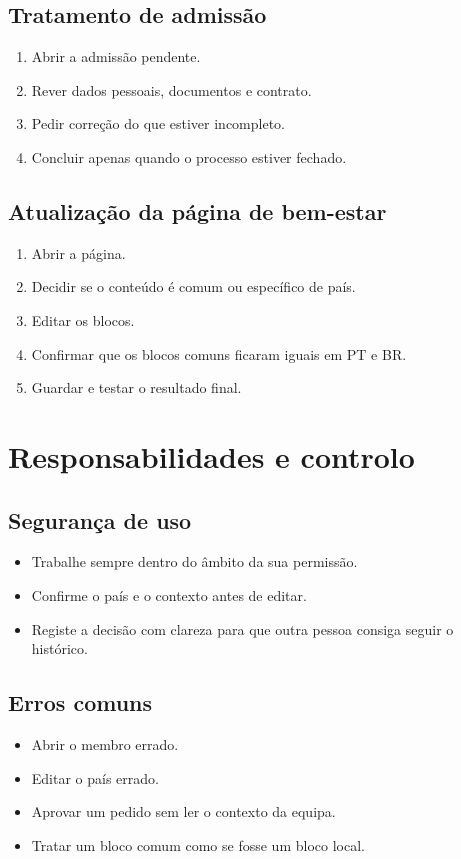 \section{Tratamento de admissão}
\begin{enumerate}
  \item Abrir a admissão pendente.
  \item Rever dados pessoais, documentos e contrato.
  \item Pedir correção do que estiver incompleto.
  \item Concluir apenas quando o processo estiver fechado.
\end{enumerate}

\section{Atualização da página de bem-estar}
\begin{enumerate}
  \item Abrir a página.
  \item Decidir se o conteúdo é comum ou específico de país.
  \item Editar os blocos.
  \item Confirmar que os blocos comuns ficaram iguais em PT e BR.
  \item Guardar e testar o resultado final.
\end{enumerate}

\chapter{Responsabilidades e controlo}
\section{Segurança de uso}
\begin{itemize}
  \item Trabalhe sempre dentro do âmbito da sua permissão.
  \item Confirme o país e o contexto antes de editar.
  \item Registe a decisão com clareza para que outra pessoa consiga seguir o histórico.
\end{itemize}

\section{Erros comuns}
\begin{itemize}
  \item Abrir o membro errado.
  \item Editar o país errado.
  \item Aprovar um pedido sem ler o contexto da equipa.
  \item Tratar um bloco comum como se fosse um bloco local.
\end{itemize}

